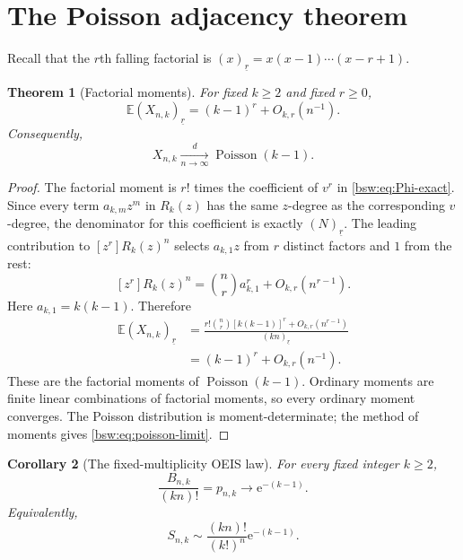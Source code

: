 \documentclass[11pt,letterpaper]{article}
\newtheorem{theorem}{Theorem}[section]
\newtheorem{corollary}[theorem]{Corollary}
\theoremstyle{definition}
\theoremstyle{remark}
\newcommand{\EE}{\mathbb E}
\newcommand{\ee}{\mathrm e}
\newcommand{\fall}[2]{(#1)_{\underline{#2}}}
\newcommand{\coef}[2]{[#1]#2}
\newcommand{\Pois}{\operatorname{Poisson}}
\begin{document}
\section{The Poisson adjacency theorem}

Recall that the $r$th falling factorial is
$\fall{x}{r}=x(x-1)\cdots(x-r+1)$.

\begin{theorem}[Factorial moments]\label{bsw:thm:factorial-moments}
For fixed $k\ge2$ and fixed $r\ge0$,
\begin{equation}\label{bsw:eq:fm-limit}
 \EE\fall{X_{n,k}}{r}=(k-1)^r+O_{k,r}(n^{-1}).
\end{equation}
Consequently,
\begin{equation}\label{bsw:eq:poisson-limit}
 \boxed{\displaystyle
 X_{n,k}\xrightarrow[n\to\infty]{d}\Pois(k-1).}
\end{equation}
\end{theorem}

\begin{proof}
The factorial moment is $r!$ times the coefficient of $v^r$ in
\eqref{bsw:eq:Phi-exact}.  Since every term $a_{k,m}z^m$ in $R_k(z)$ has the same
$z$-degree as the corresponding $v$-degree, the denominator for this
coefficient is exactly $\fall{N}{r}$.  The leading contribution to
$\coef{z^r}R_k(z)^n$ selects $a_{k,1}z$ from $r$ distinct factors and $1$
from the rest:
\[
 \coef{z^r}R_k(z)^n
 =\binom nr a_{k,1}^r+O_{k,r}(n^{r-1}).
\]
Here $a_{k,1}=k(k-1)$.  Therefore
\begin{align*}
 \EE\fall{X_{n,k}}r
 &=\frac{r!\binom nr[k(k-1)]^r+O_{k,r}(n^{r-1})}
         {\fall{kn}{r}}\\
 &=(k-1)^r+O_{k,r}(n^{-1}).
\end{align*}
These are the factorial moments of $\Pois(k-1)$.  Ordinary moments are finite
linear combinations of factorial moments, so every ordinary moment converges.
The Poisson distribution is moment-determinate; the method of moments gives
\eqref{bsw:eq:poisson-limit}.
\end{proof}

\begin{corollary}[The fixed-multiplicity OEIS law]\label{bsw:cor:main-limit}
For every fixed integer $k\ge2$,
\begin{equation}\label{bsw:eq:main-limit}
 \boxed{\displaystyle
 \frac{B_{n,k}}{(kn)!}=p_{n,k}\longrightarrow\ee^{-(k-1)}.}
\end{equation}
Equivalently,
\begin{equation}\label{bsw:eq:multiset-leading}
 S_{n,k}\sim\frac{(kn)!}{(k!)^n}\ee^{-(k-1)}.
\end{equation}
\end{corollary}
\end{document}
